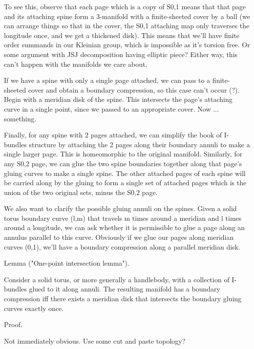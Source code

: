\documentclass[12pt]{amsart}
\theoremstyle{definition}
\theoremstyle{remark}
\begin{document}
To see this, observe that each page which is a copy of S0,1 means that that
page and its attaching spine form a 3-manifold with a finite-sheeted cover by
a ball (we can arrange things so that in the cover, the S0,1 attaching map only
traverses the longitude once, and we get a thickened disk). This means that
we'll have finite order summands in our Kleinian group, which is impossible as
it's torsion free. Or some argument with JSJ decomposition having elliptic
piece? Either way, this can't happen with the manifolds we care about.

If we have a spine with only a single page attached, we can pass to
a finite-sheeted cover and obtain a boundary compression, so this case can't
occur (?). Begin with a meridian disk of the spine.  This intersects the page's
attaching curve in a single point, since we passed to an appropriate cover. Now
... something. %

Finally, for any spine with 2 pages attached, we can simplify the book of
I-bundles structure by attaching the 2 pages along their boundary annuli to
make a single larger page. This is homeomorphic to the original manifold.
Similarly, for any S0,2 page, we can glue the two spine boundaries together
along that page's gluing curves to make a single spine. The other attached
pages of each spine will be carried along by the gluing to form a single set of
attached pages which is the union of the two original sets, minus the S0,2
page.

We also want to clarify the possible gluing annuli on the spines. Given a solid
torus boundary curve (l,m) that travels m times around a meridian and l times
around a longitude, we can ask whether it is permissible to glue a page along
an annulus parallel to this curve. Obviously if we glue our pages along
meridian curves (0,1), we'll have a boundary compression along a parallel
meridian disk.


Lemma ("One-point intersection lemma").

Consider a solid torus, or more generally a handlebody, with a collection of
I-bundles glued to it along annuli. The resulting manifold has a boundary
compression iff there exists a meridian disk that intersects the boundary
gluing curves exactly once.

Proof.

Not immediately obvious. Use some cut and paste topology? %
\end{document}

